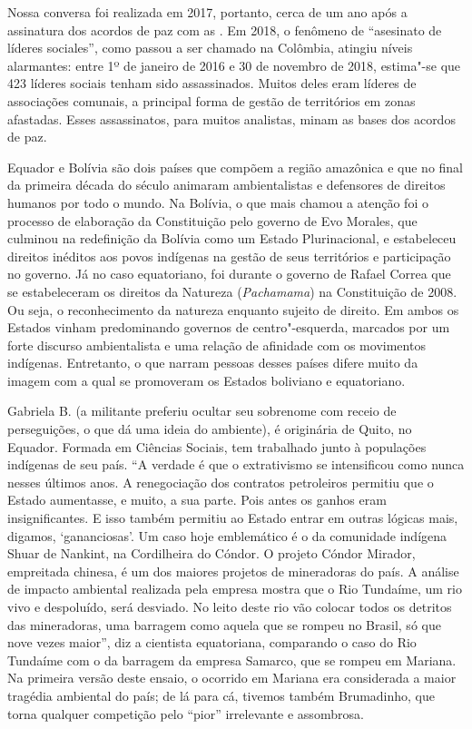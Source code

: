Nossa conversa foi realizada em 2017, portanto, cerca de um ano após a
assinatura dos acordos de paz com as . Em 2018, o fenômeno de
``asesinato de líderes sociales'', como passou a ser chamado na
Colômbia, atingiu níveis alarmantes: entre 1º de
janeiro de 2016 e 30 de novembro de 2018, estima"-se que 423 líderes
sociais tenham sido assassinados. Muitos deles eram líderes de
associações comunais, a principal forma de gestão de territórios em
zonas afastadas. Esses assassinatos, para muitos analistas, minam as
bases dos acordos de paz.

Equador e Bolívia são dois países que compõem a região amazônica e que
no final da primeira década do século  animaram ambientalistas e
defensores de direitos humanos por todo o mundo. Na Bolívia, o que mais
chamou a atenção foi o processo de elaboração da Constituição pelo
governo de Evo Morales, que culminou na redefinição da Bolívia como um
Estado Plurinacional, e estabeleceu direitos inéditos aos povos
indígenas na gestão de seus territórios e participação no governo. Já no
caso equatoriano, foi durante o governo de Rafael Correa que se
estabeleceram os direitos da Natureza (\emph{Pachamama}) na Constituição
de 2008. Ou seja, o reconhecimento da natureza enquanto
sujeito de direito. Em ambos os Estados vinham predominando governos de
centro"-esquerda, marcados por um forte discurso ambientalista e uma
relação de afinidade com os movimentos indígenas. Entretanto, o que
narram pessoas desses países difere muito da imagem com a qual se
promoveram os Estados boliviano e equatoriano.

Gabriela B. (a militante preferiu ocultar seu sobrenome com receio de
perseguições, o que dá uma ideia do ambiente), é originária de
Quito, no Equador. Formada em Ciências Sociais, tem trabalhado junto à
populações indígenas de seu país. ``A verdade é que o extrativismo se
intensificou como nunca nesses últimos anos. A renegociação dos
contratos petroleiros permitiu que o Estado aumentasse, e muito, a sua
parte. Pois antes os ganhos eram insignificantes. E isso também permitiu
ao Estado entrar em outras lógicas mais, digamos, `gananciosas'. Um
caso hoje emblemático é o da comunidade indígena Shuar de Nankint, na
Cordilheira do Cóndor. O projeto Cóndor Mirador, empreitada chinesa, é
um dos maiores projetos de mineradoras do país. A análise de impacto
ambiental realizada pela empresa mostra que o Rio Tundaíme, um rio vivo
e despoluído, será desviado. No leito deste rio vão colocar todos os
detritos das mineradoras, uma barragem como aquela que se rompeu no
Brasil, só que nove vezes maior'', diz a cientista equatoriana,
comparando o caso do Rio Tundaíme com o da barragem da empresa Samarco,
que se rompeu em Mariana. Na primeira versão deste ensaio, o ocorrido em Mariana era considerada a maior tragédia ambiental do país; de lá para cá, tivemos também Brumadinho, que torna qualquer competição pelo ``pior'' irrelevante e assombrosa.

